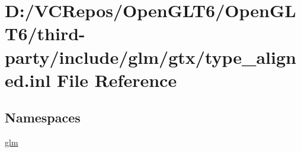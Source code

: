 \hypertarget{type__aligned_8inl}{}\section{D\+:/\+V\+C\+Repos/\+Open\+G\+L\+T6/\+Open\+G\+L\+T6/third-\/party/include/glm/gtx/type\+\_\+aligned.inl File Reference}
\label{type__aligned_8inl}
\subsection*{Namespaces}
\begin{DoxyCompactItemize}
\item 
 \mbox{\hyperlink{namespaceglm}{glm}}
\end{DoxyCompactItemize}
